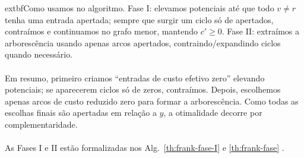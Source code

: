 \documentclass[12pt,a4paper]{article}
\def\emph#1{#1}%
\begin{document}
extbf{Como usamos no algoritmo.} Fase I: elevamos potenciais até que todo \(v\neq r\) tenha uma entrada apertada; sempre que surgir um ciclo só de apertados, contraímos e continuamos no grafo menor, mantendo \(c'\ge 0\). Fase II: extraímos a arborescência usando apenas arcos apertados, contraindo/expandindo ciclos quando necessário.
\paragraph{}

Em resumo, primeiro criamos “entradas de custo efetivo zero” elevando potenciais; se aparecerem ciclos só de zeros, contraímos. Depois, escolhemos apenas arcos de custo reduzido zero para formar a arborescência. Como todas as escolhas finais são \emph{apertadas} em relação a \(y\), a otimalidade decorre por complementaridade.

\paragraph{}
As Fases I e II estão formalizadas nos Alg.\ \ref{th:frank-fase-I} e \ref{th:frank-fase} \cite{frank2014}.

\end{document}
